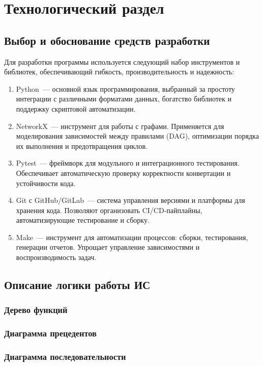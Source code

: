 \chapter{Технологический раздел}

\section{Выбор и обоснование средств разработки}

Для разработки программы используется
следующий набор инструментов и библиотек,
обеспечивающий гибкость, производительность и надежность:

\begin{enumerate}
	\item Python~--- основной язык программирования,
		выбранный за простоту интеграции с различными форматами данных,
		богатство библиотек и поддержку скриптовой автоматизации.
	\item NetworkX~--- инструмент для работы с графами.
		Применяется для моделирования зависимостей между правилами (DAG),
		оптимизации порядка их выполнения и предотвращения циклов.
	\item Pytest~--- фреймворк для модульного
		и интеграционного тестирования.
		Обеспечивает автоматическую проверку корректности конвертации
		и устойчивости кода.
	\item Git с GitHub/GitLab~--- система управления версиями
		и платформы для хранения кода.
		Позволяют организовать CI/CD-пайплайны,
		автоматизирующие тестирование и сборку.
	\item Make~--- инструмент для автоматизации процессов:
		сборки, тестирования, генерации отчетов.
		Упрощает управление зависимостями и воспроизводимость задач.
\end{enumerate}

\section{Описание логики работы ИС}

\subsection{Дерево функций}

\subsection{Диаграмма прецедентов}

\subsection{Диаграмма последовательности}

